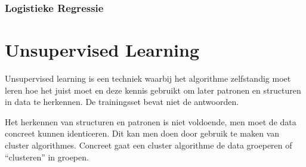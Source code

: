 \subsubsection{Logistieke Regressie}\label{Logistieke Regressie}

\section{Unsupervised Learning}\label{Unsupervised Learning}

Unsupervised learning is een techniek waarbij het algorithme zelfstandig moet leren hoe het juist moet en deze kennis gebruikt om later patronen en structuren in data te herkennen. De trainingsset bevat niet de antwoorden.

Het herkennen van structuren en patronen is niet voldoende, men moet de data concreet kunnen identiceren. Dit kan men doen door gebruik te maken van cluster algorithmes. Concreet gaat een cluster algorithme de data groeperen of ``clusteren'' in groepen.



